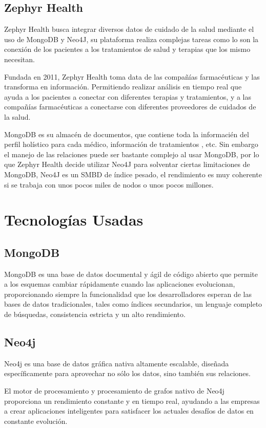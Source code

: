 \documentclass[conference]{IEEEtran}
\begin{document}
\subsection{Zephyr Health}
Zephyr Health busca integrar diversos datos de cuidado de la salud mediante el uso de MongoDB y Neo4J, su plataforma realiza complejas tareas como lo son la conexi\'on de los pacientes a los tratamientos de salud y terapias que los mismo necesitan.\cite{zephyr}

	Fundada en 2011, Zephyr Health toma data de las compañ\'ias farmac\'euticas y las transforma en informaci\'on. Permitiendo realizar an\'alisis en tiempo real que ayuda a los pacientes a conectar con diferentes terapias y tratamientos, y a las compañ\'ias farmac\'euticas a conectarse con diferentes proveedores de cuidados de la salud.

MongoDB es su almac\'en de documentos, que contiene toda la informaci\'en del perfil hol\'istico para cada m\'edico, informaci\'on de tratamientos , etc. Sin embargo el manejo de las relaciones puede ser bastante complejo al usar MongoDB, por lo que Zephyr Health decide utilizar Neo4J para solventar ciertas limitaciones de MongoDB, Neo4J es un SMBD de \'indice pesado, el rendimiento es muy coherente si se trabaja con unos pocos miles de nodos o unos pocos millones.

\section{Tecnolog\'ias Usadas}
\subsection{MongoDB}
MongoDB es una base de datos documental y \'agil de c\'odigo abierto que permite a los esquemas cambiar r\'apidamente cuando las aplicaciones evolucionan, proporcionando siempre la funcionalidad que los desarrolladores esperan de las bases de datos tradicionales, tales como \'indices secundarios, un lenguaje completo de b\'usquedas, consistencia estricta y un alto rendimiento.\cite{mongo}

\subsection{Neo4j}
Neo4j es una base de datos gr\'afica nativa altamente escalable, diseñada espec\'ificamente para aprovechar no s\'olo los datos, sino tambi\'en sus relaciones.

El motor de procesamiento y procesamiento de grafos nativo de Neo4j proporciona un rendimiento constante y en tiempo real, ayudando a las empresas a crear aplicaciones inteligentes para satisfacer los actuales desafíos de datos en constante evolución.\cite{neo}
\end{document}
